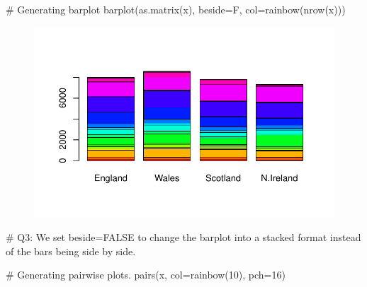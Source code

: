 \documentclass[
  letterpaper,
  DIV=11,
  numbers=noendperiod]{scrartcl}
\newenvironment{Shaded}{\begin{snugshade}}{\end{snugshade}}
\newcommand{\AttributeTok}[1]{\textcolor[rgb]{0.40,0.45,0.13}{#1}}
\newcommand{\CommentTok}[1]{\textcolor[rgb]{0.37,0.37,0.37}{#1}}
\newcommand{\DecValTok}[1]{\textcolor[rgb]{0.68,0.00,0.00}{#1}}
\newcommand{\FunctionTok}[1]{\textcolor[rgb]{0.28,0.35,0.67}{#1}}
\newcommand{\NormalTok}[1]{\textcolor[rgb]{0.00,0.23,0.31}{#1}}
\begin{document}
\begin{Shaded}
\begin{Highlighting}[]
\CommentTok{\# Generating barplot}
\FunctionTok{barplot}\NormalTok{(}\FunctionTok{as.matrix}\NormalTok{(x), }\AttributeTok{beside=}\NormalTok{F, }\AttributeTok{col=}\FunctionTok{rainbow}\NormalTok{(}\FunctionTok{nrow}\NormalTok{(x)))}
\end{Highlighting}
\end{Shaded}

\begin{figure}[H]

{\centering \includegraphics{Lab-7_files/figure-pdf/unnamed-chunk-19-1.pdf}

}

\end{figure}

\begin{Shaded}
\begin{Highlighting}[]
\CommentTok{\# Q3: We set beside=FALSE to change the barplot into a stacked format instead of the bars being side by side.}
\end{Highlighting}
\end{Shaded}

\begin{Shaded}
\begin{Highlighting}[]
\CommentTok{\# Generating pairwise plots. }
\FunctionTok{pairs}\NormalTok{(x, }\AttributeTok{col=}\FunctionTok{rainbow}\NormalTok{(}\DecValTok{10}\NormalTok{), }\AttributeTok{pch=}\DecValTok{16}\NormalTok{)}
\end{Highlighting}
\end{Shaded}
\end{document}
